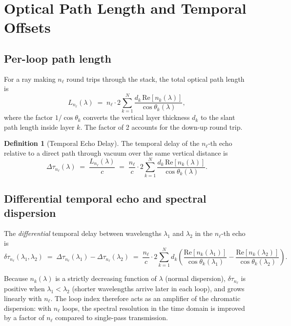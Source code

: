 \documentclass[11pt,twocolumn,a4paper]{article}
\theoremstyle{plain}
\theoremstyle{definition}
\newtheorem{definition}[theorem]{Definition}
\theoremstyle{remark}
\begin{document}
\section{Optical Path Length and Temporal Offsets}
\label{sec:temporal}

\subsection{Per-loop path length}

For a ray making $n_\ell$ round trips through the stack, the total optical path length is
\begin{equation}
\label{eq:opl}
  L_{n_\ell}(\lambda) \;=\; n_\ell \cdot 2\sum_{k=1}^N \frac{d_k\,\mathrm{Re}[n_k(\lambda)]}{\cos\theta_k(\lambda)},
\end{equation}
where the factor $1/\cos\theta_k$ converts the vertical layer thickness $d_k$ to the slant path length inside layer $k$. The factor of 2 accounts for the down-up round trip.

\begin{definition}[Temporal Echo Delay]
\label{def:temporal-echo}
The temporal delay of the $n_\ell$-th echo relative to a direct path through vacuum over the same vertical distance is
\begin{equation}
\label{eq:temporal-delay}
  \Delta\tau_{n_\ell}(\lambda) \;=\; \frac{L_{n_\ell}(\lambda)}{c} \;=\; \frac{n_\ell}{c}\cdot 2\sum_{k=1}^N \frac{d_k\,\mathrm{Re}[n_k(\lambda)]}{\cos\theta_k(\lambda)}.
\end{equation}
\end{definition}

\subsection{Differential temporal echo and spectral dispersion}

The \emph{differential} temporal delay between wavelengths $\lambda_1$ and $\lambda_2$ in the $n_\ell$-th echo is
\begin{equation}
\label{eq:differential-delay}
  \delta\tau_{n_\ell}(\lambda_1,\lambda_2) \;=\; \Delta\tau_{n_\ell}(\lambda_1) - \Delta\tau_{n_\ell}(\lambda_2) \;=\; \frac{n_\ell}{c}\cdot 2\sum_{k=1}^N d_k\left(\frac{\mathrm{Re}[n_k(\lambda_1)]}{\cos\theta_k(\lambda_1)} - \frac{\mathrm{Re}[n_k(\lambda_2)]}{\cos\theta_k(\lambda_2)}\right).
\end{equation}

Because $n_k(\lambda)$ is a strictly decreasing function of $\lambda$ (normal dispersion), $\delta\tau_{n_\ell}$ is positive when $\lambda_1<\lambda_2$ (shorter wavelengths arrive later in each loop), and grows linearly with $n_\ell$. The loop index therefore acts as an amplifier of the chromatic dispersion: with $n_\ell$ loops, the spectral resolution in the time domain is improved by a factor of $n_\ell$ compared to single-pass transmission.
\end{document}
